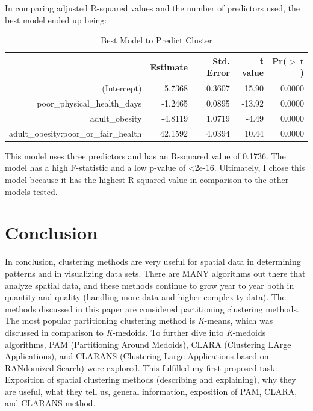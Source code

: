 \documentclass[12pt,twoside]{amherstthesis}
\begin{document}
  In comparing adjusted R-squared values and the number of predictors
  used, the best model ended up being:
  
  \begin{Shaded}
  \begin{Highlighting}[]
  \end{Highlighting}
  \end{Shaded}
  
  \begin{table}[ht]
  \centering
  \begin{tabular}{rrrrr}
    \hline
   & Estimate & Std. Error & t value & Pr($>$$|$t$|$) \\ 
    \hline
  (Intercept) & 5.7368 & 0.3607 & 15.90 & 0.0000 \\ 
    poor\_physical\_health\_days & -1.2465 & 0.0895 & -13.92 & 0.0000 \\ 
    adult\_obesity & -4.8119 & 1.0719 & -4.49 & 0.0000 \\ 
    adult\_obesity:poor\_or\_fair\_health & 42.1592 & 4.0394 & 10.44 & 0.0000 \\ 
     \hline
  \end{tabular}
  \caption{Best Model to Predict Cluster} 
  \end{table}
  
  This model uses three predictors and has an R-squared value of 0.1736.
  The model has a high F-statistic and a low p-value of \textless{}2e-16.
  Ultimately, I chose this model because it has the highest R-squared
  value in comparison to the other models tested.
  
  \chapter*{Conclusion}\label{conclusion}
  
  \setcounter{chapter}{4} \setcounter{section}{0}
  
  In conclusion, clustering methods are very useful for spatial data in
  determining patterns and in visualizing data sets. There are MANY
  algorithms out there that analyze spatial data, and these methods
  continue to grow year to year both in quantity and quality (handling
  more data and higher complexity data). The methods discussed in this
  paper are considered partitioning clustering methods. The most popular
  partitioning clustering method is \emph{K}-means, which was discussed in
  comparison to \emph{K}-medoids. To further dive into \emph{K}-medoids
  algorithms, PAM (Partitioning Around Medoids), CLARA (Clustering LArge
  Applications), and CLARANS (Clustering Large Applications based on
  RANdomized Search) were explored. This fulfilled my first proposed task:
  Exposition of spatial clustering methods (describing and explaining),
  why they are useful, what they tell us, general information, exposition
  of PAM, CLARA, and CLARANS method.
  
\end{document}
